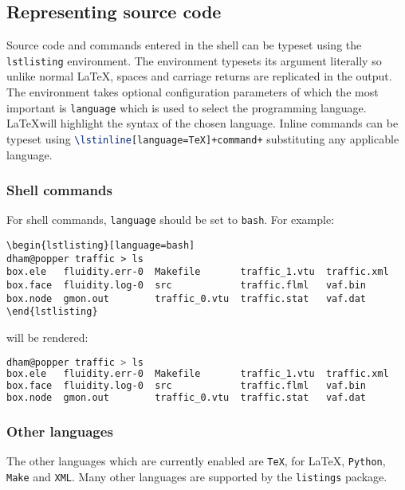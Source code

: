 \subsection{Representing source code}

Source code and commands entered in the shell can be typeset using the
\lstinline[language=TeX]+lstlisting+ environment. The environment typesets
its argument literally so unlike normal \LaTeX, spaces and carriage returns
are replicated in the output. The environment takes optional configuration
parameters of which the most important is 
\lstinline[language=TeX]+language+ which is used to select the programming
language. \LaTeX will highlight the syntax of the chosen language. Inline
commands can be typeset using\linebreak
\lstinline[language=TeX]*\lstinline[language=TeX]+command+* substituting any
applicable language. 

\subsubsection{Shell commands}

For shell commands, \lstinline[language=TeX]+language+ should be set to
\lstinline[language=TeX]+bash+. For example:
\begin{verbatim}
\begin{lstlisting}[language=bash]
dham@popper traffic > ls
box.ele   fluidity.err-0  Makefile       traffic_1.vtu  traffic.xml
box.face  fluidity.log-0  src            traffic.flml   vaf.bin
box.node  gmon.out        traffic_0.vtu  traffic.stat   vaf.dat
\end{lstlisting}
\end{verbatim}
will be rendered:
\begin{lstlisting}[language=bash]
dham@popper traffic > ls 
box.ele   fluidity.err-0  Makefile       traffic_1.vtu  traffic.xml
box.face  fluidity.log-0  src            traffic.flml   vaf.bin
box.node  gmon.out        traffic_0.vtu  traffic.stat   vaf.dat
\end{lstlisting}

\subsubsection{Other languages}

The other languages which are currently enabled are
\lstinline[language=TeX]+TeX+, for \LaTeX, \lstinline[language=TeX]+Python+,
\lstinline[language=TeX]+Make+ and \lstinline[language=TeX]+XML+. Many other
languages are supported by the \lstinline[language=TeX]+listings+ package.


